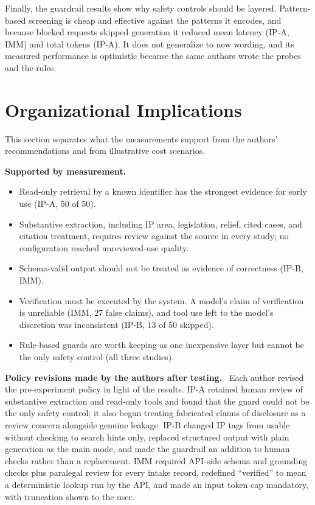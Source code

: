 \documentclass[10pt,letterpaper]{article}
\newcommand{\para}[1]{\textbf{#1}\ }
\begin{document}
Finally, the guardrail results show why safety controls should be layered. Pattern-based screening is cheap and effective against the patterns it encodes, and because blocked requests skipped generation it reduced mean latency (IP-A, IMM) and total tokens (IP-A). It does not generalize to new wording, and its measured performance is optimistic because the same authors wrote the probes and the rules.

\section{Organizational Implications}\label{sec:org}
This section separates what the measurements support from the authors' recommendations and from illustrative cost scenarios.

\para{Supported by measurement.}
\begin{itemize}
\item Read-only retrieval by a known identifier has the strongest evidence for early use (IP-A, 50 of 50).
\item Substantive extraction, including IP area, legislation, relief, cited cases, and citation treatment, requires review against the source in every study; no configuration reached unreviewed-use quality.
\item Schema-valid output should not be treated as evidence of correctness (IP-B, IMM).
\item Verification must be executed by the system. A model's claim of verification is unreliable (IMM, 27 false claims), and tool use left to the model's discretion was inconsistent (IP-B, 13 of 50 skipped).
\item Rule-based guards are worth keeping as one inexpensive layer but cannot be the only safety control (all three studies).
\end{itemize}

\para{Policy revisions made by the authors after testing.} Each author revised the pre-experiment policy in light of the results. IP-A retained human review of substantive extraction and read-only tools and found that the guard could not be the only safety control; it also began treating fabricated claims of disclosure as a review concern alongside genuine leakage. IP-B changed IP tags from usable without checking to search hints only, replaced structured output with plain generation as the main mode, and made the guardrail an addition to human checks rather than a replacement. IMM required API-side schema and grounding checks plus paralegal review for every intake record, redefined ``verified'' to mean a deterministic lookup run by the API, and made an input token cap mandatory, with truncation shown to the user.
\end{document}
